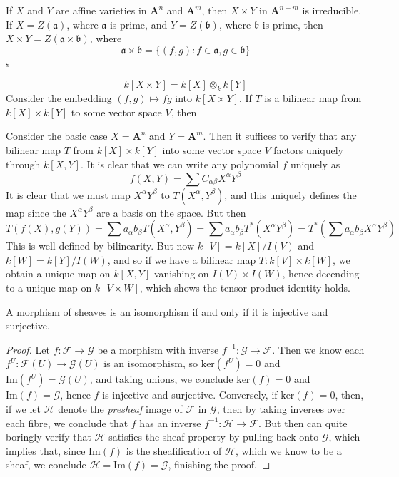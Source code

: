 If $X$ and $Y$ are affine varieties in $\mathbf{A}^n$ and $\mathbf{A}^m$, then $X \times Y$ in $\mathbf{A}^{n+m}$ is irreducible. If $X = Z(\mathfrak{a})$, where $\mathfrak{a}$ is prime, and $Y = Z(\mathfrak{b})$, where $\mathfrak{b}$ is prime, then $X \times Y = Z(\mathfrak{a} \times \mathfrak{b})$, where
%
\[ \mathfrak{a} \times \mathfrak{b} = \{ (f,g) : f \in \mathfrak{a}, g \in \mathfrak{b} \} \]
%
s

\[ k[X \times Y] = k[X] \otimes_k k[Y] \]
%
Consider the embedding $(f,g) \mapsto fg$ into $k[X \times Y]$. If $T$ is a bilinear map from $k[X] \times k[Y]$ to some vector space $V$, then 

Consider the basic case $X = \mathbf{A}^n$ and $Y = \mathbf{A}^m$. Then it suffices to verify that any bilinear map $T$ from $k[X] \times k[Y]$ into some vector space $V$ factors uniquely through $k[X, Y]$. It is clear that we can write any polynomial $f$ uniquely as
%
\[ f(X,Y) = \sum C_{\alpha \beta} X^\alpha Y^\beta \]
%
It is clear that we must map $X^\alpha Y^\beta$ to $T(X^\alpha, Y^\beta)$, and this uniquely defines the map since the $X^\alpha Y^\beta$ are a basis on the space. But then
%
\[ T(f(X), g(Y)) = \sum a_\alpha b_\beta T(X^\alpha, Y^\beta) = \sum a_\alpha b_\beta T^*(X^\alpha Y^\beta) = T^* \left(\sum a_\alpha b_\beta X^\alpha Y^\beta \right) \]
%
This is well defined by bilinearity. But now $k[V] = k[X]/I(V)$ and $k[W] = k[Y]/I(W)$, and so if we have a bilinear map $T: k[V] \times k[W]$, we obtain a unique map on $k[X,Y]$ vanishing on $I(V) \times I(W)$, hence decending to a unique map on $k[V \times W]$, which shows the tensor product identity holds.

\begin{theorem}
    A morphism of sheaves is an isomorphism if and only if it is injective and surjective.
\end{theorem}
\begin{proof}
    Let $f: \mathcal{F} \to \mathcal{G}$ be a morphism with inverse $f^{-1}: \mathcal{G} \to \mathcal{F}$. Then we know each $f^U: \mathcal{F}(U) \to \mathcal{G}(U)$ is an isomorphism, so $\text{ker}(f^U) = 0$ and $\text{Im}(f^U) = \mathcal{G}(U)$, and taking unions, we conclude $\text{ker}(f) = 0$ and $\text{Im}(f) = \mathcal{G}$, hence $f$ is injective and surjective. Conversely, if $\text{ker}(f) = 0$, then, if we let $\mathcal{H}$ denote the {\it presheaf} image of $\mathcal{F}$ in $\mathcal{G}$, then by taking inverses over each fibre, we conclude that $f$ has an inverse $f^{-1}: \mathcal{H} \to \mathcal{F}$. But then can quite boringly verify that $\mathcal{H}$ satisfies the sheaf property by pulling back onto $\mathcal{G}$, which implies that, since $\text{Im}(f)$ is the sheafification of $\mathcal{H}$, which we know to be a sheaf, we conclude $\mathcal{H} = \text{Im}(f) = \mathcal{G}$, finishing the proof.
\end{proof}

